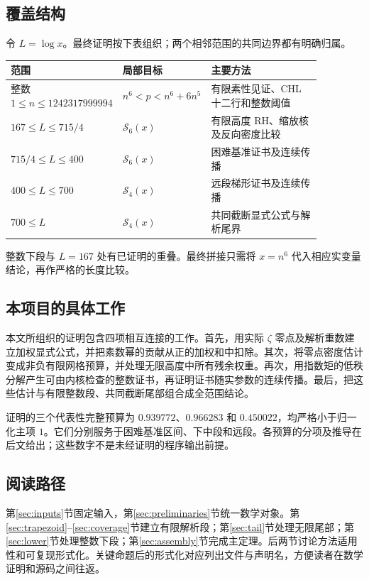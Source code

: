 \subsection{覆盖结构}
令 $L=\log x$。最终证明按下表组织；两个相邻范围的共同边界都有明确归属。
\begin{center}\small
\begin{tabular}{p{0.26\linewidth}p{0.25\linewidth}p{0.36\linewidth}}
\toprule
范围 & 局部目标 & 主要方法\\
\midrule
整数 $1\le n\le1242317999994$ & $n^6<p<n^6+6n^5$ & 有限素性见证、CHL 十二行和整数阈值\\
$167\le L\le715/4$ & $\mathcal S_6(x)$ & 有限高度 RH、缩放核及反向密度比较\\
$715/4\le L\le400$ & $\mathcal S_6(x)$ & 困难基准证书及连续传播\\
$400\le L\le700$ & $\mathcal S_4(x)$ & 远段梯形证书及连续传播\\
$700\le L$ & $\mathcal S_4(x)$ & 共同截断显式公式与解析尾界\\
\bottomrule
\end{tabular}\end{center}
整数下段与 $L=167$ 处有已证明的重叠。最终拼接只需将 $x=n^6$ 代入相应实变量结论，再作严格的长度比较。

\subsection{本项目的具体工作}
本文所组织的证明包含四项相互连接的工作。首先，用实际 $\zeta$ 零点及解析重数建立加权显式公式，并把素数幂的贡献从正的加权和中扣除。其次，将零点密度估计变成非负有限网格预算，并处理无限高度中所有残余权重。再次，用指数矩的低秩分解产生可由内核检查的整数证书，再证明证书随实参数的连续传播。最后，把这些估计与有限整数段、共同截断尾部组合成全范围结论。

证明的三个代表性完整预算为 $0.939772$、$0.966283$ 和 $0.450022$，均严格小于归一化主项 $1$。它们分别服务于困难基准区间、下中段和远段。各预算的分项及推导在后文给出；这些数字不是未经证明的程序输出前提。

\subsection{阅读路径}
第\ref{sec:inputs}节固定输入，第\ref{sec:preliminaries}节统一数学对象。第\ref{sec:trapezoid}--\ref{sec:coverage}节建立有限解析段；第\ref{sec:tail}节处理无限尾部；第\ref{sec:lower}节处理整数下段；第\ref{sec:assembly}节完成主定理。后两节讨论方法适用性和可复现形式化。关键命题后的形式化对应列出文件与声明名，方便读者在数学证明和源码之间往返。

